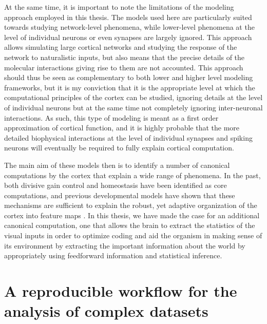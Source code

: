 At the same time, it is important to note the limitations of the
modeling approach employed in this thesis. The models used here are
particularly suited towards studying network-level phenomena, while
lower-level phenomena at the level of individual neurons or even
synapses are largely ignored. This approach allows simulating large
cortical networks and studying the response of the network to
naturalistic inputs, but also means that the precise details of the
molecular interactions giving rise to them are not accounted. This
approach should thus be seen as complementary to both lower and higher
level modeling frameworks, but it is my conviction that it is the
appropriate level at which the computational principles of the cortex
can be studied, ignoring details at the level of individual neurons
but at the same time not completely ignoring inter-neuronal
interactions. As such, this type of modeling is meant as a first
order approximation of cortical function, and it is highly probable
that the more detailed biophysical interactions at the level of
individual synapses and spiking neurons will eventually be required to
fully explain cortical computation.

The main aim of these models then is to identify a number of canonical
computations by the cortex that explain a wide range of phenomena. In
the past, both divisive gain control \citep{Carandini2012} and
homeostasis \citep{Marder2006} have been identified as core
computations, and previous developmental models have shown that these
mechanisms are sufficient to explain the robust, yet adaptive
organization of the cortex into feature maps \citep{Stevens2013}. In
this thesis, we have made the case for an additional canonical
computation, one that allows the brain to extract the statistics of the
visual inputs in order to optimize coding and aid the organism in making
sense of its environment by extracting the important information about
the world by appropriately using feedforward information and
statistical inference.

\section{A reproducible workflow for the analysis of complex datasets}

